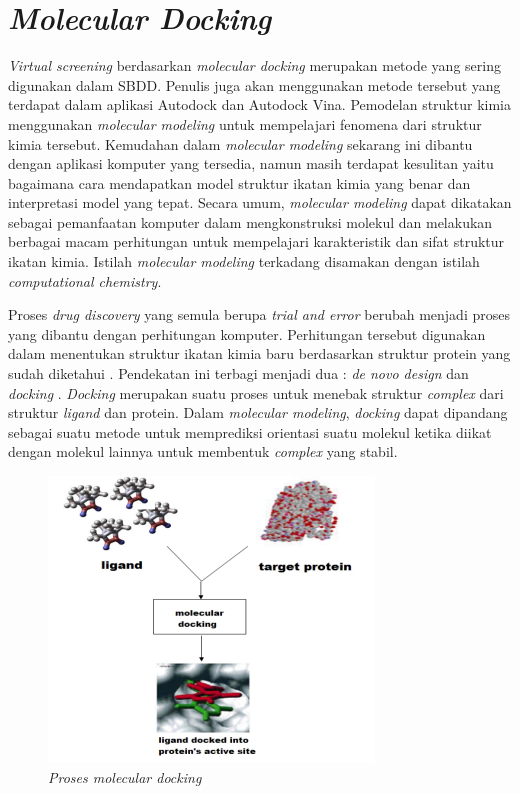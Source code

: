 \section{\textit{Molecular Docking}}

\hspace{0.5 cm}\textit{Virtual screening} berdasarkan \textit{molecular docking} merupakan metode yang sering digunakan dalam SBDD. Penulis juga akan menggunakan metode tersebut yang terdapat dalam aplikasi Autodock dan Autodock Vina. Pemodelan struktur kimia menggunakan \textit{molecular modeling} untuk mempelajari fenomena dari struktur kimia tersebut. Kemudahan dalam \textit{molecular modeling} sekarang ini dibantu dengan aplikasi komputer yang tersedia, namun masih terdapat kesulitan yaitu bagaimana cara mendapatkan model struktur ikatan kimia yang benar dan interpretasi model yang tepat. Secara umum, \textit{molecular modeling} dapat dikatakan sebagai pemanfaatan komputer dalam mengkonstruksi molekul dan melakukan berbagai macam perhitungan untuk mempelajari karakteristik dan sifat struktur ikatan kimia. Istilah \textit{molecular modeling} terkadang disamakan dengan istilah \textit{computational chemistry}.

Proses \textit{drug discovery} yang semula berupa \textit{trial and error} berubah menjadi proses yang dibantu dengan perhitungan komputer. Perhitungan tersebut digunakan dalam menentukan struktur ikatan kimia baru berdasarkan struktur protein yang sudah diketahui \cite{doCADD}. Pendekatan ini terbagi menjadi dua : \textit{de novo design} \cite{De Novo} dan \textit{docking} \cite{Docking and Scoring}. \textit{Docking} merupakan suatu proses untuk menebak struktur \textit{complex} dari struktur \textit{ligand} dan protein. Dalam \textit{molecular modeling}, \textit{docking} dapat dipandang sebagai suatu metode untuk memprediksi orientasi suatu molekul ketika diikat dengan molekul lainnya untuk membentuk \textit{complex} yang stabil.  
\begin{figure}
	\centering
	\includegraphics{docking.png}
	\caption{\textit{Proses molecular docking }\cite{MolecularDocking}}
\end{figure}

